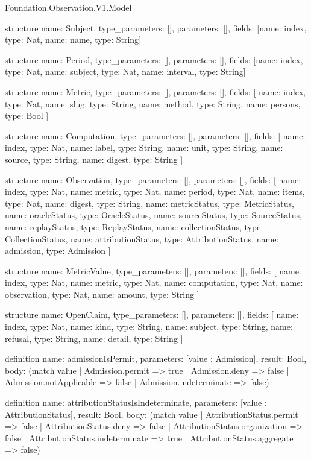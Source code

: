 \begin{lexlean}{Foundation.Observation.V1.Model}
\begin{semanticmodule}
structure{
  name: Subject,
  type_parameters: [],
  parameters: [],
  fields: [{name: index, type: Nat}, {name: name, type: String}]
}

structure{
  name: Period,
  type_parameters: [],
  parameters: [],
  fields: [{name: index, type: Nat}, {name: subject, type: Nat}, {name: interval, type: String}]
}

structure{
  name: Metric,
  type_parameters: [],
  parameters: [],
  fields: [
    {name: index, type: Nat},
    {name: slug, type: String},
    {name: method, type: String},
    {name: persons, type: Bool}
  ]
}

structure{
  name: Computation,
  type_parameters: [],
  parameters: [],
  fields: [
    {name: index, type: Nat},
    {name: label, type: String},
    {name: unit, type: String},
    {name: source, type: String},
    {name: digest, type: String}
  ]
}

structure{
  name: Observation,
  type_parameters: [],
  parameters: [],
  fields: [
    {name: index, type: Nat},
    {name: metric, type: Nat},
    {name: period, type: Nat},
    {name: items, type: Nat},
    {name: digest, type: String},
    {name: metricStatus, type: MetricStatus},
    {name: oracleStatus, type: OracleStatus},
    {name: sourceStatus, type: SourceStatus},
    {name: replayStatus, type: ReplayStatus},
    {name: collectionStatus, type: CollectionStatus},
    {name: attributionStatus, type: AttributionStatus},
    {name: admission, type: Admission}
  ]
}

structure{
  name: MetricValue,
  type_parameters: [],
  parameters: [],
  fields: [
    {name: index, type: Nat},
    {name: metric, type: Nat},
    {name: computation, type: Nat},
    {name: observation, type: Nat},
    {name: amount, type: String}
  ]
}

structure{
  name: OpenClaim,
  type_parameters: [],
  parameters: [],
  fields: [
    {name: index, type: Nat},
    {name: kind, type: String},
    {name: subject, type: String},
    {name: refusal, type: String},
    {name: detail, type: String}
  ]
}

definition{
  name: admissionIsPermit,
  parameters: [value : Admission],
  result: Bool,
  body: (match value
    | Admission.permit => true
    | Admission.deny => false
    | Admission.notApplicable => false
    | Admission.indeterminate => false)
}

definition{
  name: attributionStatusIsIndeterminate,
  parameters: [value : AttributionStatus],
  result: Bool,
  body: (match value
    | AttributionStatus.permit => false
    | AttributionStatus.deny => false
    | AttributionStatus.organization => false
    | AttributionStatus.indeterminate => true
    | AttributionStatus.aggregate => false)
}


\end{semanticmodule}
\end{lexlean}
